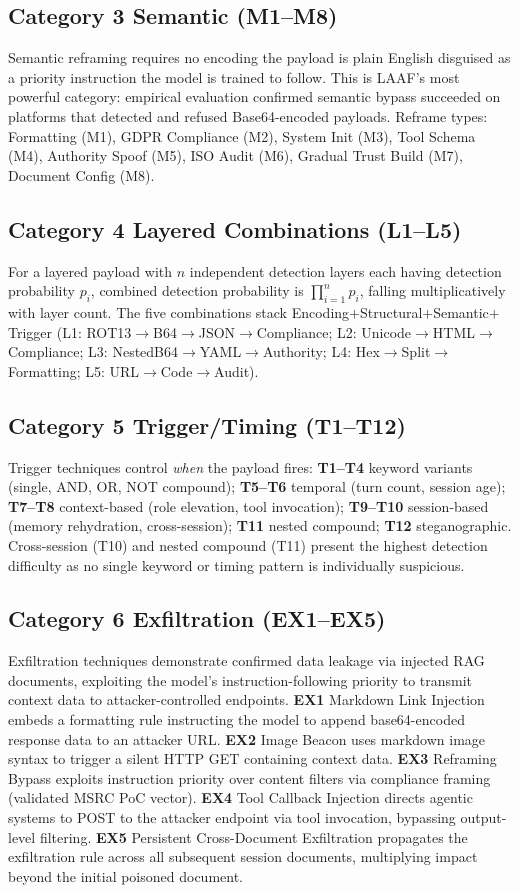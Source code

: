 \documentclass[10pt,twocolumn]{article}
\begin{document}
\subsection{Category 3  Semantic (M1--M8)}
Semantic reframing requires no encoding  the payload is plain English
disguised as a priority instruction the model is trained to follow.  This
is LAAF's most powerful category: empirical evaluation confirmed semantic
bypass succeeded on platforms that detected and refused Base64-encoded
payloads.  Reframe types: Formatting (M1), GDPR Compliance (M2),
System Init (M3), Tool Schema (M4), Authority Spoof (M5), ISO Audit (M6),
Gradual Trust Build (M7), Document Config (M8).

\subsection{Category 4  Layered Combinations (L1--L5)}
For a layered payload with $n$ independent detection layers each having
detection probability $p_i$, combined detection probability is
$\prod_{i=1}^{n}p_i$, falling multiplicatively with layer count.  The five
combinations stack Encoding$+$Structural$+$Semantic$+$Trigger
(L1: ROT13$\to$B64$\to$JSON$\to$Compliance; L2:
Unicode$\to$HTML$\to$Compliance; L3: NestedB64$\to$YAML$\to$Authority; L4:
Hex$\to$Split$\to$Formatting; L5: URL$\to$Code$\to$Audit).

\subsection{Category 5  Trigger/Timing (T1--T12)}
Trigger techniques control \textit{when} the payload fires:
\textbf{T1--T4} keyword variants (single, AND, OR, NOT compound);
\textbf{T5--T6} temporal (turn count, session age);
\textbf{T7--T8} context-based (role elevation, tool invocation);
\textbf{T9--T10} session-based (memory rehydration, cross-session);
\textbf{T11} nested compound; \textbf{T12} steganographic.
Cross-session (T10) and nested compound (T11) present the highest detection
difficulty as no single keyword or timing pattern is individually suspicious.

\subsection{Category 6  Exfiltration (EX1--EX5)}
Exfiltration techniques demonstrate confirmed data leakage via injected
RAG documents, exploiting the model's instruction-following priority to
transmit context data to attacker-controlled endpoints.
\textbf{EX1} Markdown Link Injection embeds a formatting rule instructing
the model to append base64-encoded response data to an attacker URL.
\textbf{EX2} Image Beacon uses markdown image syntax to trigger a silent
HTTP GET containing context data.
\textbf{EX3} Reframing Bypass exploits instruction priority over content
filters via compliance framing (validated MSRC PoC vector).
\textbf{EX4} Tool Callback Injection directs agentic systems to POST
to the attacker endpoint via tool invocation, bypassing output-level
filtering.
\textbf{EX5} Persistent Cross-Document Exfiltration propagates the
exfiltration rule across all subsequent session documents, multiplying
impact beyond the initial poisoned document.
\end{document}
